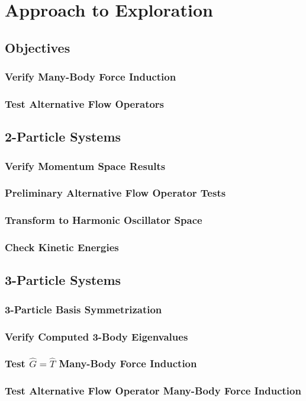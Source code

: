 \chapter{Approach to Exploration}

\section{Objectives}

\subsection{Verify Many-Body Force Induction}

\subsection{Test Alternative Flow Operators}

\section{2-Particle Systems}

\subsection{Verify Momentum Space Results}

\subsection{Preliminary Alternative Flow Operator Tests}

\subsection{Transform to Harmonic Oscillator Space}

\subsection{Check Kinetic Energies}

\section{3-Particle Systems}

\subsection{3-Particle Basis Symmetrization}

\subsection{Verify Computed 3-Body Eigenvalues}

\subsection{Test $\hat{G}=\hat{T}$ Many-Body Force Induction}

\subsection{Test Alternative Flow Operator Many-Body Force Induction}
